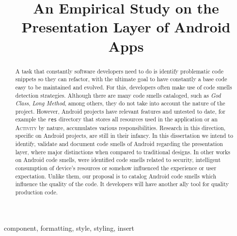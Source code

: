 \documentclass[conference]{IEEEtran}
\begin{document}
\title{An Empirical Study on the Presentation Layer of Android Apps}

\author{
\and
{}
\and
{}
}

\maketitle

\begin{abstract} 
A task that constantly software developers need to do is
identify problematic code snippets so they can refactor, with the ultimate
goal to have constantly a base code easy to be maintained and evolved. For
this, developers often make use of code smells detection strategies. Although
there are many code smells cataloged, such as \textit{God Class}, \textit{Long
Method}, among others, they do not take into account the nature of the
project. However, Android projects have relevant features and untested to
date, for example the \texttt{res} directory that stores all resources used in
the application or an \textsc{Activity} by nature, accumulates various
responsibilities. Research in this direction, specific on Android projects,
are still in their infancy. In this dissertation we intend to identify,
validate and document code smells of Android regarding the presentation layer,
where major distinctions when compared to traditional designs. In other works
on Android code smells, were identified code smells related to security,
intelligent consumption of device's resources or somehow influenced the
experience or user expectation. Unlike them, our proposal is to catalog
Android code smells which influence the quality of the code. It developers
will have another ally tool for quality production code. 
\end{abstract}

\begin{IEEEkeywords}
component, formatting, style, styling, insert
\end{IEEEkeywords}










\end{document}
